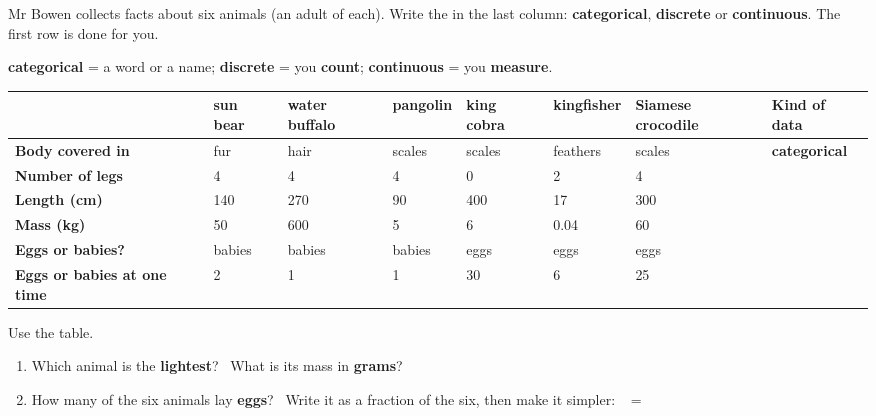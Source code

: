 \documentclass[12pt,a4paper]{article}
\newcommand{\tl}[1]{{\color{cbteal}\bfseries #1}}
\newcommand{\tall}{\rule[-0.6em]{0pt}{1.9em}}
\begin{document}

\noindent\begin{minipage}{\textwidth}
\noindent Mr Bowen collects facts about six animals (an adult of each). Write the
 in the last column: \textbf{categorical}, \textbf{discrete} or
\textbf{continuous}. The first row is done for you.

\vspace{3pt}
 \textbf{categorical} = a word or a name;
\textbf{discrete} = you \textbf{count}; \textbf{continuous} = you \textbf{measure}.

\vspace{6pt}
{\small\renewcommand{\arraystretch}{1.55}%
\noindent\begin{tabularx}{\textwidth}{|P{1.95cm}|C{1.25cm}|C{1.3cm}|C{1.5cm}|C{1.2cm}|C{1.8cm}|C{1.5cm}|L|}
  \hline
  & \textbf{sun bear} & \textbf{water buffalo} & \textbf{pangolin} & \textbf{king cobra}
    & \textbf{kingfisher} & \textbf{Siamese croc\-odile} & \textbf{Kind of data} \\ \hline
  \textbf{Body covered in} & fur & hair & scales & scales & feathers & scales &
    \tl{categorical} \\ \hline
  \textbf{Number of legs} & 4 & 4 & 4 & 0 & 2 & 4 & \tall \\ \hline
  \textbf{Length (cm)} & 140 & 270 & 90 & 400 & 17 & 300 & \tall \\ \hline
  \textbf{Mass (kg)} & 50 & 600 & 5 & 6 & 0.04 & 60 & \tall \\ \hline
  \textbf{Eggs or babies?} & babies & babies & babies & eggs & eggs & eggs & \tall \\ \hline
  \textbf{Eggs or babies at one time} & 2 & 1 & 1 & 30 & 6 & 25 & \tall \\ \hline
\end{tabularx}}
\end{minipage}

\vspace{8pt}
\noindent\begin{minipage}{\textwidth}
\noindent Use the table.
\begin{enumerate}[label=(\alph*), itemsep=9pt, topsep=4pt]
  \item Which animal is the \textbf{lightest}? \ \blank[3.0cm] \quad What is its mass in
        \textbf{grams}? \ \blank[2.2cm]
  \item How many of the six animals lay \textbf{eggs}? \ \blank[1.4cm] \quad Write it as a
        fraction of the six, then make it simpler: \ \blank[1.4cm] $=$ \blank[1.4cm]
\end{enumerate}
\end{minipage}
\end{document}
